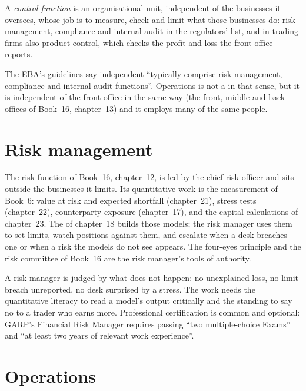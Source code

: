 \begin{definition}\label{def:in:risk-operations-product-control-and-compliance:control}
A \emph{control function} is an organisational unit, independent of the businesses it
oversees, whose job is to measure, check and limit what those businesses do: risk management, compliance and internal
audit in the regulators' list, and in trading firms also product control, which checks the profit and loss the front
office reports.
\end{definition}

The EBA's guidelines say independent  ``typically comprise risk management, compliance and internal
audit functions''. Operations is not a  in that sense, but it is independent of the front office in the
same way (the front, middle and back offices of Book~16, chapter~13) and it employs many of the same people.

\section{Risk management}

The risk function of Book~16, chapter~12, is led by the chief risk officer and sits outside the businesses it limits.
Its quantitative work is the measurement of Book~6: value at risk and expected shortfall (chapter~21), stress tests
(chapter~22), counterparty exposure (chapter~17), and the capital calculations of chapter~23. The  of
chapter~18 builds those models; the risk manager uses them to set limits, watch positions against them, and escalate
when a desk breaches one or when a risk the models do not see appears. The four-eyes principle and the risk committee of
Book~16 are the risk manager's tools of authority.

A risk manager is judged by what does not happen: no unexplained loss, no limit breach unreported, no desk surprised by a
stress. The work needs the quantitative literacy to read a model's output critically and the standing to say no to a
trader who earns more. Professional certification is common and optional: GARP's Financial Risk Manager requires passing
``two multiple-choice Exams'' and ``at least two years of relevant work experience''.

\section{Operations}

